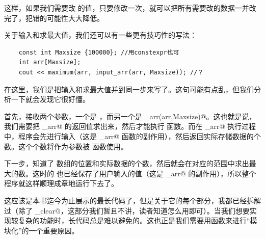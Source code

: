 这样，如果我们需要改 \lstinline@Maxsize@ 的值，只要修改一次，就可以把所有需要改的数据一并改完了，犯错的可能性大大降低。\par
关于输入和求最大值，我们还可以有一些更有技巧性的写法：
\begin{lstlisting}
    const int Maxsize {100000}; //用constexpr也可
    int arr[Maxsize];
    cout << maximum(arr, input_arr(arr, Maxsize)); //？
\end{lstlisting}
在这里，我们是把输入和求最大值并到同一步来写了。这句可能有点乱，但我们分析一下就会发现它很好懂。\par
首先，\lstinline@maximum@ 接收两个参数，一个是 \lstinline@arr@，而另一个是 \lstinline@input_arr(arr,Maxsize)@。这也就是说，我们需要把 \lstinline@input_arr@ 的返回值求出来，然后才能执行 \lstinline@maximum@ 函数。而在 \lstinline@input_arr@ 执行过程中，程序会先进行输入（这是 \lstinline@input_arr@ 函数的副作用），然后返回实际存储数据的个数。这个个数将作为参数被 \lstinline@maximum@ 函数使用。\par
下一步，\lstinline@maximum@ 知道了 \lstinline@arr@ 数组的位置和实际数据的个数，然后就会在对应的范围中求出最大的数。这时的 \lstinline@arr@ 也已经保存了用户输入的值（这是 \lstinline@input_arr@ 的副作用），所以整个程序就这样顺理成章地运行下去了。\par
\par
这应该是本书迄今为止展示的最长代码了，但是关于它的每个部分，我都已经拆解过（除了 \lstinline@input_clear@，这部分我们暂且不讲，读者知道怎么用即可）。当我们想要实现较复杂的功能时，长代码总是难以避免的。这也正是我们需要用函数来进行``模块化''的一个重要原因。\par
